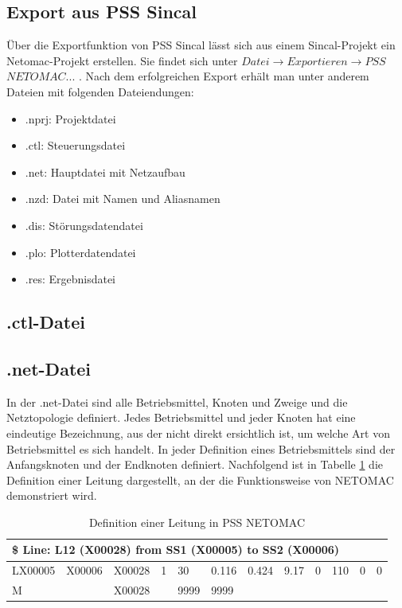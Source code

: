 \documentclass{scrartcl}
\begin{document}
\begin{onehalfspace}
\subsection{Export aus PSS Sincal}
Über die Exportfunktion von PSS Sincal lässt sich aus einem Sincal-Projekt ein Netomac-Projekt erstellen. Sie findet sich unter $Datei \rightarrow Exportieren \rightarrow PSS$ $NETOMAC...$ .  Nach dem erfolgreichen Export erhält man unter anderem  Dateien mit folgenden Dateiendungen:

\begin{itemize}
\item .nprj: Projektdatei
\item .ctl: Steuerungsdatei
\item .net: Hauptdatei mit Netzaufbau
\item .nzd: Datei mit Namen und Aliasnamen
\item .dis: Störungsdatendatei
\item .plo: Plotterdatendatei
\item .res: Ergebnisdatei
\end{itemize}


\subsection{.ctl-Datei}
\subsection{.net-Datei}
In der .net-Datei sind alle Betriebsmittel, Knoten und Zweige und die Netztopologie definiert. Jedes Betriebsmittel und jeder Knoten hat eine eindeutige Bezeichnung, aus der nicht direkt ersichtlich ist, um welche Art von Betriebsmittel es sich handelt. In jeder Definition eines Betriebsmittels sind der Anfangsknoten und der Endknoten definiert. Nachfolgend ist in Tabelle \ref{leitung-netomac-tb} die Definition einer Leitung dargestellt, an der die Funktionsweise von NETOMAC demonstriert wird.

\begin{table}[H]
\begin{tabular}{|l|l|l|l|l|l|l|l|l|l|l|l|}
\hline 
\multicolumn{12}{|l|}{\$ Line: L12 (X00028) from SS1 (X00005) to SS2 (X00006)} \\ 
\hline 
LX00005 & X00006  & X00028 & 1 & 30 & 0.116 & 0.424 & 9.17 & 0 & 110 & 0 &0 \\ 
\hline 
M & & X00028 & & 9999 & 9999 & & & & & & \\ 
\hline 
\end{tabular} 
\caption{Definition einer Leitung in PSS NETOMAC}
\label{leitung-netomac-tb}
\end{table}


\end{onehalfspace}
\end{document}
